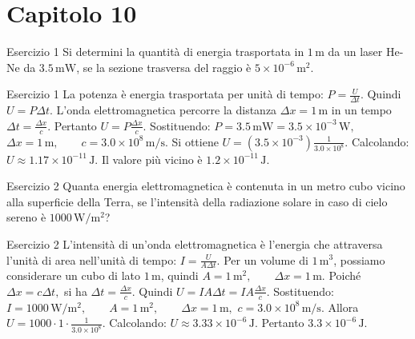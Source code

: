 \documentclass[a4paper]{article}
\begin{document}
\section{Capitolo 10}
\begin{snippetexercise}{Esercizio 1}
    Si determini la quantità di energia trasportata in \(1\,\mathrm{m}\) da un
    laser He-Ne da \(3.5\,\mathrm{mW}\), se la sezione trasversa del raggio è
    \(5 \times 10^{-6}\,\mathrm{m^2}\).

\end{snippetexercise}
\begin{snippetsolution}{Esercizio 1}
    La potenza è energia trasportata per unità di tempo:
    \(P = \frac{U}{\Delta t}.\)
    Quindi
    \(U = P\Delta t.\)
    L'onda elettromagnetica percorre la distanza
    \(\Delta x = 1\,\mathrm{m}\)
    in un tempo
    \(\Delta t = \frac{\Delta x}{c}.\)
    Pertanto
    \(U = P\frac{\Delta x}{c}.\)
    Sostituendo:
    \(P = 3.5\,\mathrm{mW} = 3.5 \times 10^{-3}\,\mathrm{W},\)
    \(\Delta x = 1\,\mathrm{m}, \qquad c = 3.0 \times 10^8\,\mathrm{m/s}.\)
    Si ottiene
    \(U = \left(3.5 \times 10^{-3}\right) \frac{1}{3.0 \times 10^8}.\)
    Calcolando:
    \(U \approx 1.17 \times 10^{-11}\,\mathrm{J}.\)
    Il valore più vicino è
    \(\boxed{1.2 \times 10^{-11}\,\mathrm{J}}.\)
\end{snippetsolution}
\begin{snippetexercise}{Esercizio 2}
    Quanta energia elettromagnetica è contenuta in un metro cubo vicino alla
    superficie della Terra, se l'intensità della radiazione solare in caso di
    cielo sereno è \(1000\,\mathrm{W/m^2}\)?

\end{snippetexercise}
\begin{snippetsolution}{Esercizio 2}
    L'intensità di un'onda elettromagnetica è l'energia che attraversa l'unità
    di area nell'unità di tempo:
    \(I = \frac{U}{A\Delta t}.\)
    Per un volume di \(1\,\mathrm{m^3}\), possiamo considerare un cubo di lato
    \(1\,\mathrm{m}\), quindi
    \(A = 1\,\mathrm{m^2}, \qquad \Delta x = 1\,\mathrm{m}.\)
    Poiché
    \(\Delta x = c\Delta t,\)
    si ha
    \(\Delta t = \frac{\Delta x}{c}.\)
    Quindi
    \(U = IA\Delta t = IA\frac{\Delta x}{c}.\)
    Sostituendo:
    \(I = 1000\,\mathrm{W/m^2}, \qquad A = 1\,\mathrm{m^2}, \qquad \Delta x = 1\,\mathrm{m},\)
    \(c = 3.0 \times 10^8\,\mathrm{m/s}.\)
    Allora
    \(U = 1000 \cdot 1 \cdot \frac{1}{3.0 \times 10^8}.\)
    Calcolando:
    \(U \approx 3.33 \times 10^{-6}\,\mathrm{J}.\)
    Pertanto
    \(\boxed{3.3 \times 10^{-6}\,\mathrm{J}}.\)
\end{snippetsolution}
\end{document}
